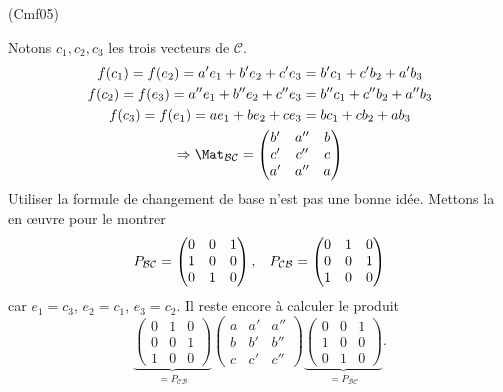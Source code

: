 \begin{tiny}(Cmf05)\end{tiny} Notons $c_1, c_2, c_3$ les trois vecteurs de $\mathcal{C}$.
\begin{multline*}
    f(c_1) = f(e_2) = a' e_1 + b'e_2 + c'e_3 = b'c_1 + c'b_2 + a'b_3 \\
    f(c_2) = f(e_3) = a'' e_1 + b''e_2 + c''e_3 = b''c_1 + c''b_2 + a''b_3\\
    f(c_3) = f(e_1) = a e_1 + b e_2 + ce_3 = bc_1 + cb_2 + ab_3
 \\
\Rightarrow
\Mat_{\mathcal{B} \mathcal{C}} =
\begin{pmatrix}
 b' & a'' & b \\
 c' & c'' & c \\
 a' & a'' & a
\end{pmatrix}
\end{multline*}
Utiliser la formule de changement de base n'est pas une bonne idée. Mettons la en \oe{}uvre pour le montrer
\[
  P_{\mathcal{B} \mathcal{C}} =
\begin{pmatrix}
 0 & 0 & 1 \\
 1 & 0 & 0 \\
 0 & 1 & 0
\end{pmatrix}, \hspace{0.3cm}
  P_{\mathcal{C}\mathcal{B}} =
\begin{pmatrix}
 0 & 1 & 0 \\
 0 & 0 & 1 \\
 1 & 0 & 0
\end{pmatrix} 
\]
car $e_1 = c_3$, $e_2 = c_1$, $e_3 = c_2$. Il reste encore à calculer le produit
\[
\underset{= P_{\mathcal{C}\mathcal{B}}}{\underbrace{
\begin{pmatrix}
 0 & 1 & 0 \\
 0 & 0 & 1 \\
 1 & 0 & 0
\end{pmatrix} }}
  \begin{pmatrix}
 a & a' & a'' \\
 b & b' & b'' \\
 c & c' & c''
\end{pmatrix}
\underset{= P_{\mathcal{B} \mathcal{C}}}{\underbrace{
\begin{pmatrix}
 0 & 0 & 1 \\
 1 & 0 & 0 \\
 0 & 1 & 0
\end{pmatrix}}}.
\]
